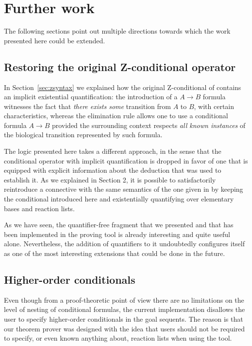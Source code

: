\section{Further work}

The following sections point out multiple directions towards which the work
presented here could be extended.

\subsection{Restoring the original Z-conditional operator}

In Section~\ref{sec:zsyntax} we explained how the original Z-conditional of
\cite{adding-logic} contains an implicit existential quantification: the
introduction of a $A \rightarrow B$ formula witnesses the fact that \emph{there
  exists some} transition from $A$ to $B$, with certain characteristics, whereas
the elimination rule allows one to use a conditional formula $A \rightarrow B$
provided the surrounding context respects \emph{all known instances} of the
biological transition represented by such formula.

The logic presented here takes a different approach, in the sense that the
conditional operator with implicit quantification is dropped in favor of one
that is equipped with explicit information about the deduction that was used to
establish it. As we explained in Section 2, it is possible to satisfactorily
reintroduce a connective with the same semantics of the one given in
\cite{adding-logic} by keeping the conditional introduced here and existentially
quantifying over elementary bases and reaction lists.

As we have seen, the quantifier-free fragment that we presented and that has
been implemented in the proving tool is already interesting and quite useful
alone. Nevertheless, the addition of quantifiers to it undoubtedly configures
itself as one of the most interesting extensions that could be done in the
future.

\subsection{Higher-order conditionals}

Even though from a proof-theoretic point of view there are no limitations on the
level of nesting of conditional formulas, the current implementation disallows
the user to specify higher-order conditionals in the goal sequents.  The reason
is that our theorem prover was designed with the idea that users should not be
required to specify, or even known anything about, reaction lists when using the
tool.

